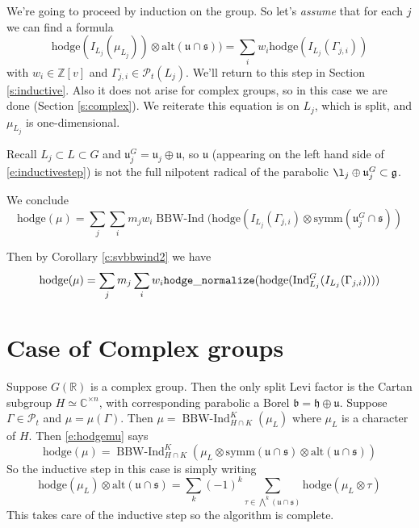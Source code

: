 \documentclass[12pt,leqno]{article}
\newcommand{\hodge}{\text{hodge}}
\DeclareMathOperator{\bbwind}{\text{BBW-Ind}}
\newcommand{\Ind}{\text{Ind}}
\newcommand\Pt{\mathcal P_t}
\newcommand{\symm}{\text{symm}}
\newcommand{\alt}{\text{alt}}
\newcommand{\R}{\mathbb R}
\newcommand{\C}{\mathbb C}
\newcommand{\Z}{\mathbb Z}
\renewcommand{\u}{\mathfrak u}
\newcommand{\ucaps}{\mathfrak u\cap\mathfrak s}
\renewcommand{\sec}[1]{\section{#1}
\renewcommand{\theequation}{\thesection.\arabic{equation}}
  \setcounter{equation}{0}}
\newcommand{\g}{\mathfrak g}
\newcommand{\s}{\mathfrak s}
\renewcommand{\sec}[1]{\section{#1}
\renewcommand{\theequation}{\thesection.\arabic{equation}}
  \setcounter{equation}{0}}
\begin{document}
We're going to proceed by induction on the group.
So let's  {\it assume} that for each $j$ we can find a formula
\begin{equation}
\label{e:inductivestep}
\hodge(I_{L_j}(\mu_{L_j}))\otimes\alt(\ucaps))
=
\sum_i w_i \hodge(I_{L_j}(\Gamma_{j,i}))
\end{equation}
with $w_i\in\Z[v]$ and $\Gamma_{j,i}\in\Pt(L_j)$.
We'll return to this step in Section \ref{s:inductive}. Also
it does not arise for complex groups, so in this case we are done (Section \ref{s:complex}).
We reiterate this equation is on $L_j$, which is split, and $\mu_{L_j}$ is one-dimensional.

\begin{remarkplain}
\label{r:nilrad}
Recall $L_j\subset L\subset G$ and $\u^G_j=\u_j\oplus\u$, so $\u$
(appearing on the left hand side of \eqref{e:inductivestep}) is not
the full nilpotent radical of the parabolic $\l_j\oplus \u^G_j\subset\g$.
\end{remarkplain}


We conclude
\begin{equation}
\label{e:conclude}
\hodge(\mu)=\sum_j\sum_i m_jw_i\bbwind(\hodge(I_{L_j}(\Gamma_{j,i})\otimes\symm(\u^G_j\cap\s))
\end{equation}

\begin{comment}

Suppose $\Ind_{Q_j}^{G}(I_{L_j}(\Gamma_{j,i}))$ is standard, and write it
$I_G(\Gamma_{G,j,i})$.  Then by Corollary \ref{c:svbbwind}
the summand on the right hand side is
$$
m_iw_j\hodge(I_G(\Gamma_{G,i,j})).
$$
\end{comment}
Then by Corollary \ref{c:svbbwind2} we have
$$
\hodge(\mu)=\sum_jm_j\sum_i w_i{\tt hodge\_normalize}(\hodge(\Ind_{L_j}^G(I_{L_j}(\Gamma_{j,i}))))
$$




\sec{Case of Complex groups}
\label{s:complex}

Suppose $G(\R)$ is a complex group. Then the only split Levi factor is the
Cartan subgroup $H\simeq \C^{\times n}$, with corresponding parabolic a Borel $\mathfrak b=\mathfrak h\oplus\u$.
 Suppose $\Gamma\in\Pt$ and $\mu=\mu(\Gamma)$.
Then $\mu=\bbwind_{H\cap K}^K(\mu_L)$ where $\mu_L$ is a character of $H$.
Then \eqref{e:hodgemu} says
$$
\hodge(\mu)=\bbwind_{H\cap K}^K(\mu_L\otimes \symm(\ucaps)\otimes\alt(\ucaps))
$$
So the inductive step in this case is simply writing
$$
\hodge(\mu_L)\otimes\alt(\ucaps)=
\sum_k (-1)^k\sum_{\tau\in\bigwedge\nolimits^k(\ucaps)}\hodge(\mu_L\otimes\tau)
$$
This takes care of the inductive step so the algorithm is complete.
\end{document}
